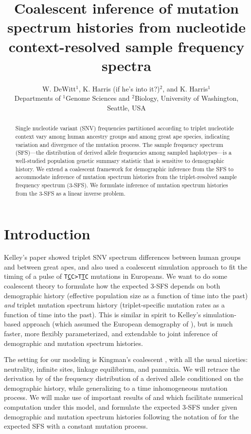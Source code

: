 \documentclass[11pt]{article}
\title{Coalescent inference of mutation spectrum histories from nucleotide context-resolved sample frequency spectra}
\author{
W. DeWitt$^{1}$, K. Harris (if he's into it?)$^{2}$, and K. Harris$^{1}$\\
\small{Departments of $^1$Genome Sciences and $^2$Biology, University of Washington, Seattle, USA}
}
\begin{document}
\maketitle

\begin{abstract}

Single nucleotide variant (SNV) frequencies partitioned according to triplet nucleotide context vary among human ancestry groups and among great ape species, indicating variation and divergence of the mutation process.
The sample frequency spectrum (SFS)---the distribution of derived allele frequencies among sampled haplotypes---is a well-studied population genetic summary statistic that is sensitive to demographic history.
We extend a coalescent framework for demographic inference from the SFS to accommodate inference of mutation spectrum histories from the triplet-resolved sample frequency spectrum (3-SFS).
We formulate inference of mutation spectrum histories from the 3-SFS as a linear inverse problem.

\end{abstract}


\section*{Introduction}\label{sec:intro}

Kelley's paper \cite{Harris2017-fw} showed triplet SNV spectrum differences between human groups and between great apes, and also used a coalescent simulation approach to fit the timing of a pulse of \texttt{T\underline{C}C>T\underline{T}C} mutations in Europeans.
We want to do some coalescent theory to formulate how the expected 3-SFS depends on both demographic history (effective population size as a function of time into the past) \emph{and} triplet mutation spectrum history (triplet-specific mutation rates as a function of time into the past).
This is similar in spirit to Kelley's simulation-based approach (which assumed the European demography of \cite{Tennessen2012-dq}), but is much faster, more flexibly parameterized, and extendable to joint inference of demographic and mutation spectrum histories.

The setting for our modeling is Kingman's coalescent \citep{Kingman1982-ge, Kingman1982-tf, Kingman1982-ys, Kingman2000-jr}, with all the usual niceties: neutrality, infinite sites, linkage equilibrium, and panmixia.
We will retrace the derivation by \cite{Griffiths1998-qf} of the frequency distribution of a derived allele conditioned on the demographic history, while generalizing to a time inhomogeneous mutation process.
We will make use of important results of \cite{Polanski2003-kg} and \cite{Polanski2003-ll} which facilitate numerical computation under this model, and formulate the expected 3-SFS under given demographic and mutation spectrum histories following the notation of \cite{Rosen2018-bb} for the expected SFS with a constant mutation process.
\end{document}
